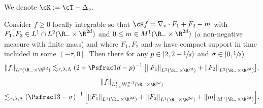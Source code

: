 We denote $\cK := \cT - \Delta_v$.
\begin{lemma}
\label{lem:Kolmogorov}
Consider $f \ge 0$ locally integrable so that
$\cK f = \nabla_v \cdot F_1 + F_2 - m$ with
$F_1,F_2 \in L^1 \cap L^2(\R_- \times \R^{2d})$ and
$0 \le m \in M^1(\R_- \times \R^{2d})$ (a non-negative measure
with finite mass) and where $F_1, F_2$ and $m$ have compact
support in time included in some $\left(-\tau,0\right]$. Then
there for any $p \in [2,2+\sfrac1d)$ and
$\sigma \in [0,\sfrac13)$
\begin{equation}
\label{eq:Kolm1}
\| f\|_{L^{p}(\R_- \times \R^{2d})}\lesssim_{\tau,\lambda,\Lambda}
\left(2+\Psfrac1d-p\right)^{-1}
\bigl[ \left\| F_1 \right\|_{L^2(\R_- \times \R^{2d})} +
\left\| F_2 \right\|_{L^2(\R_- \times \R^{2d})} \bigr],
\end{equation}
\begin{multline}\label{eq:Kolm2}
\| f\|_{L^1_{t,v} W^{\sigma,1}_x(\R_- \times \R^{2d})} \\
\lesssim_{\tau,\lambda,\Lambda}
\left(\Psfrac13-\sigma \right)^{-1} \Bigl[ \|
F_1 \|_{L^1(\R_- \times \R^{2d})} + \left\| F_2
\right\|_{L^1(\R_- \times \R^{2d})} + \| m \|_{M^1(\R_- \times
\R^{2d})} \Bigr].
\end{multline}
\end{lemma}

